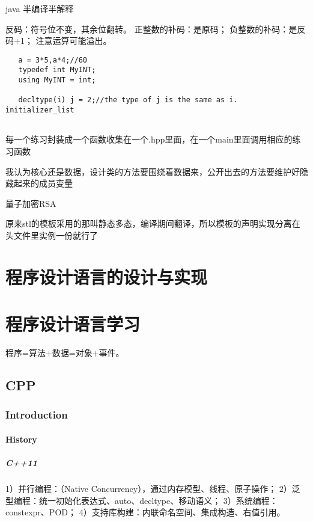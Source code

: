 \documentclass[UTF8]{../computerUniverse}
\begin{document}
java 半编译半解释

反码：符号位不变，其余位翻转。
正整数的补码：是原码；
负整数的补码：是反码+1；
注意运算可能溢出。

\begin{lstlisting}
   a = 3*5,a*4;//60
   typedef int MyINT;
   using MyINT = int;

   decltype(i) j = 2;//the type of j is the same as i.
initializer_list


 \end{lstlisting}

 每一个练习封装成一个函数收集在一个.hpp里面，在一个main里面调用相应的练习函数

 我认为核心还是数据，设计类的方法要围绕着数据来，公开出去的方法要维护好隐藏起来的成员变量

 量子加密RSA

 原来stl的模板采用的那叫静态多态，编译期间翻译，所以模板的声明实现分离在头文件里实例一份就行了





\chapter{程序设计语言的设计与实现}




\chapter{程序设计语言学习}


程序=算法+数据=对象+事件。

\section{CPP}

\subsection{Introduction}

\subsubsection{History}

\paragraph{C++11}

1）并行编程：（Native Concurrency），通过内存模型、线程、原子操作；
2）泛型编程：统一初始化表达式、auto、decltype、移动语义；
3）系统编程：constexpr、POD；
4）支持库构建：内联命名空间、集成构造、右值引用。
\end{document}
